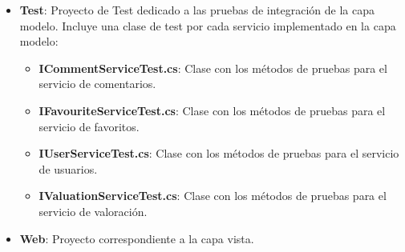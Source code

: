 \documentclass{article}
\begin{document}
\begin{itemize}
	\item \textbf{Test}: Proyecto de Test dedicado a las pruebas de integración de la capa modelo. Incluye una clase de test por cada servicio implementado en la capa modelo:
	
	\begin{itemize}
		\item \textbf{ICommentServiceTest.cs}: Clase con los métodos de pruebas para el servicio de comentarios.
		\item \textbf{IFavouriteServiceTest.cs}: Clase con los métodos de pruebas para el servicio de favoritos.
		\item \textbf{IUserServiceTest.cs}: Clase con los métodos de pruebas para el servicio de usuarios.
		\item \textbf{IValuationServiceTest.cs}: Clase con los métodos de pruebas para el servicio de valoración.
	\end{itemize}
	
	\item \textbf{Web}: Proyecto correspondiente a la capa vista.


\end{itemize}
\end{document}
